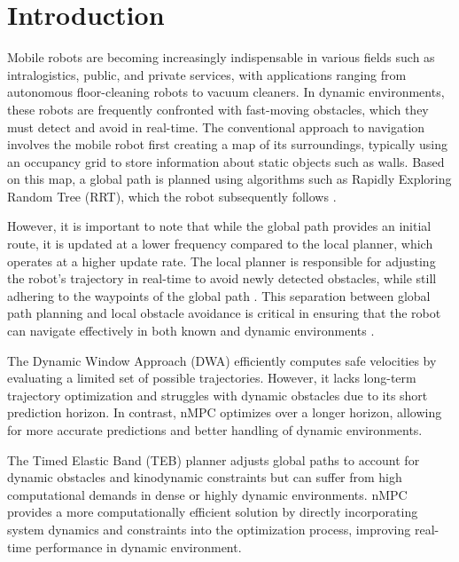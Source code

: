 \documentclass[conference]{IEEEtran}
\begin{document}
\section{Introduction}

Mobile robots are becoming increasingly indispensable in various fields such as intralogistics, public, and private services, with applications ranging from autonomous floor-cleaning robots to vacuum cleaners. In dynamic environments, these robots are frequently confronted with fast-moving obstacles, which they must detect and avoid in real-time. The conventional approach to navigation involves the mobile robot first creating a map of its surroundings, typically using an occupancy grid to store information about static objects such as walls. Based on this map, a global path is planned using algorithms such as Rapidly Exploring Random Tree (RRT), which the robot subsequently follows \cite{thrun2005probabilistic}.

However, it is important to note that while the global path provides an initial route, it is updated at a lower frequency compared to the local planner, which operates at a higher update rate. The local planner is responsible for adjusting the robot's trajectory in real-time to avoid newly detected obstacles, while still adhering to the waypoints of the global path \cite{siegwart2011autonomous}. This separation between global path planning and local obstacle avoidance is critical in ensuring that the robot can navigate effectively in both known and dynamic environments \cite{khatib1986real}.


The Dynamic Window Approach (DWA) efficiently computes safe velocities by evaluating a limited set of possible trajectories. However, it lacks long-term trajectory optimization and struggles with dynamic obstacles due to its short prediction horizon. In contrast, nMPC optimizes over a longer horizon, allowing for more accurate predictions and better handling of dynamic environments.

The Timed Elastic Band (TEB) planner adjusts global paths to account for dynamic obstacles and kinodynamic constraints but can suffer from high computational demands in dense or highly dynamic environments. nMPC provides a more computationally efficient solution by directly incorporating system dynamics and constraints into the optimization process, improving real-time performance in dynamic environment.
\end{document}
